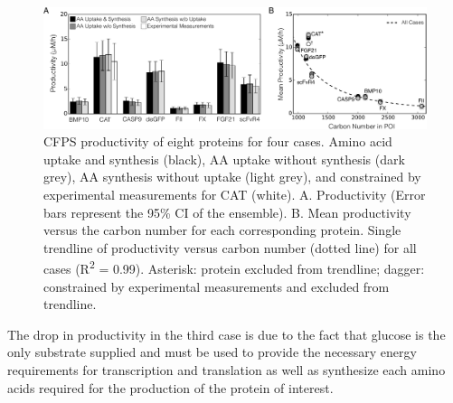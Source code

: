 \documentclass[journal=asbcd6,manuscript=article]{achemso}
\begin{document}
\begin{figure}[t!]
\centering
\includegraphics[width=1.00\textwidth]{./Figures/Productivity.pdf}
\caption{CFPS productivity of eight proteins for four cases. Amino acid uptake and synthesis (black), AA uptake without synthesis (dark grey), AA synthesis without uptake (light grey), and constrained by experimental measurements for CAT (white). A. Productivity (Error bars represent the 95\% CI of the ensemble). B. Mean productivity versus the carbon number for each corresponding protein. Single trendline of productivity versus carbon number (dotted line) for all cases (R\textsuperscript{2} = 0.99). Asterisk: protein excluded from trendline; dagger: constrained by experimental measurements and excluded from trendline.}
\label{fig:Prod}
\end{figure}


The drop in productivity in the third case is due to the fact that glucose is the only substrate supplied and must be used to provide the necessary energy requirements for transcription and translation as well as synthesize each amino acids required for the production of the protein of interest.  
\end{document}
